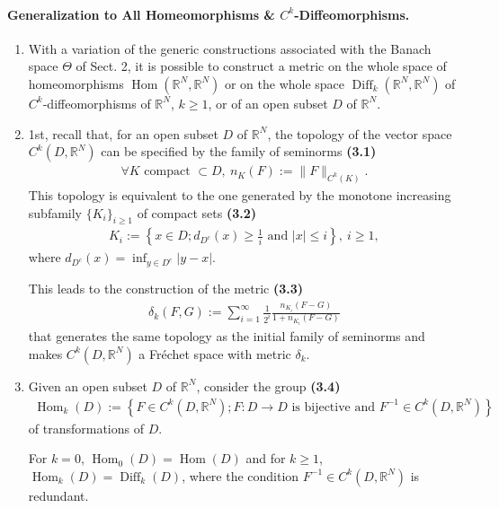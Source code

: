 \documentclass{book}
\numberwithin{equation}{section}
\begin{document}
\paragraph{Generalization to All Homeomorphisms \& $C^k$-Diffeomorphisms.} 
\begin{enumerate}
    \item With a variation of the generic constructions associated with the Banach space $\Theta$ of Sect. 2, it is possible to construct a metric on the whole space of homeomorphisms $\operatorname{Hom}(\mathbb{R}^N,\mathbb{R}^N)$ or on the whole space $\operatorname{Diff}_k(\mathbb{R}^N,\mathbb{R}^N)$ of $C^k$-diffeomorphisms of $\mathbb{R}^N$, $k\ge 1$, or of an open subset $D$ of $\mathbb{R}^N$.
    \item 1st, recall that, for an open subset $D$ of $\mathbb{R}^N$, the topology of the vector space $C^k(D,\mathbb{R}^N)$ can be specified by the family of seminorms \textbf{(3.1)}
    \begin{align*}
        \forall K \mbox{ compact } \subset D,\ n_K(F) := \|F\|_{C^k(K)}.
    \end{align*}
    This topology is equivalent to the one generated by the monotone increasing subfamily $\{K_i\}_{i\ge 1}$ of compact sets \textbf{(3.2)}
    \begin{align*}
        K_i := \left\{x\in D;d_{D^c}(x)\ge\frac{1}{i} \mbox{ and } |x|\le i\right\},\ i\ge 1,
    \end{align*}
    where $d_{D^c}(x) = \inf_{y\in D^c} |y - x|$.
    
    This leads to the construction of the metric \textbf{(3.3)}
    \begin{align*}
        \delta_k(F,G) := \sum_{i=1}^\infty \frac{1}{2^i}\frac{n_{K_i}(F - G)}{1 + n_{K_i}(F - G)}
    \end{align*}
    that generates the same topology as the initial family of seminorms and makes $C^k(D,\mathbb{R}^N)$ a  Fréchet space with metric $\delta_k$.
    \item Given an open subset $D$ of $\mathbb{R}^N$, consider the group \textbf{(3.4)}
    \begin{align*}
        \operatorname{Hom}_k(D) := \left\{F\in C^k(D,\mathbb{R}^N);F:D\to D \mbox{ is bijective and } F^{-1}\in C^k(D,\mathbb{R}^N)\right\}
    \end{align*}
    of transformations of $D$.
    
    For $k = 0$, $\operatorname{Hom}_0(D) = \operatorname{Hom}(D)$ and for $k\ge 1$, $\operatorname{Hom}_k(D) = \operatorname{Diff}_k(D)$, where the condition $F^{-1}\in C^k(D,\mathbb{R}^N)$ is redundant.
    

\end{enumerate}
\end{document}
